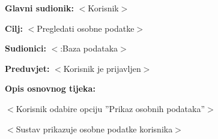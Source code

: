 					\noindent {}
					\begin{packed_item}
						
						\item \textbf{Glavni sudionik: }$<$Korisnik$>$
						\item  \textbf{Cilj:} $<$Pregledati osobne podatke$>$
						\item  \textbf{Sudionici:} $<$:Baza podataka$>$
						\item  \textbf{Preduvjet:} $<$Korisnik je prijavljen$>$
						\item  \textbf{Opis osnovnog tijeka:}
						
						\item[] \begin{packed_enum}
							
							\item $<$Korisnik odabire opciju ”Prikaz osobnih podataka”$>$
							\item $<$Sustav prikazuje osobne podatke korisnika$>$
						\end{packed_enum}

					\end{packed_item}
					
